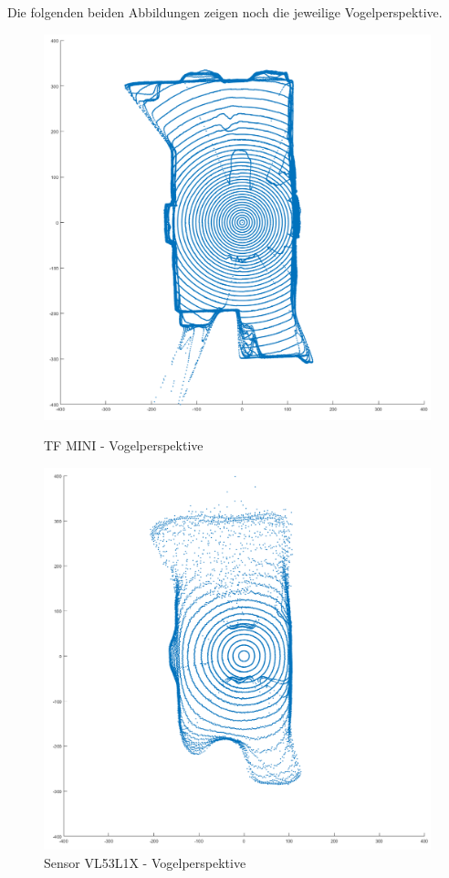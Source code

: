 Die folgenden beiden Abbildungen zeigen noch die jeweilige Vogelperspektive. \\



\begin{figure}[htb]
	\centering
	\begin{minipage}[t]{0.45\linewidth}
		\centering
		\includegraphics[width=1.2\linewidth]{images/Validierung/Aufloesungen/mittel_vogel.png}
		\caption{TF MINI - Vogelperspektive}
	\end{minipage}
	\hfill
	\begin{minipage}[t]{0.45\linewidth}
		\centering
		\includegraphics[width=1.2\linewidth]{images/Validierung/VL53_vogel.png}
		\caption{Sensor VL53L1X - Vogelperspektive}
	\end{minipage}
\end{figure}


